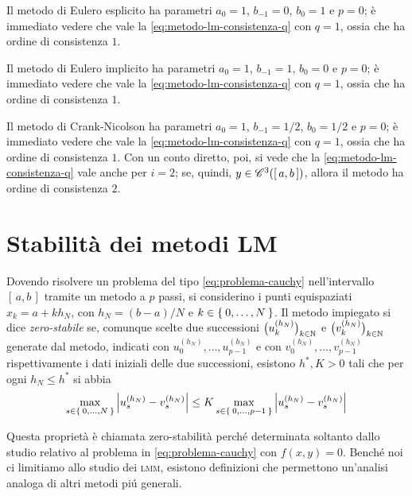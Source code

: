 	\begin{esempio}
		Il metodo di Eulero esplicito ha parametri \(a_0 = 1\), \(b_{- 1} = 0\), \(b_0 = 1\) e \(p = 0\); è immediato vedere che vale la \eqref{eq:metodo-lm-consistenza-q} con \(q = 1\), ossia che ha ordine di consistenza \(1\).
		
		Il metodo di Eulero implicito ha parametri \(a_0 = 1\), \(b_{- 1} = 1\), \(b_0 = 0\) e \(p = 0\); è immediato vedere che vale la \eqref{eq:metodo-lm-consistenza-q} con \(q = 1\), ossia che ha ordine di consistenza \(1\).
		
		Il metodo di Crank-Nicolson ha parametri \(a_0 = 1\), \(b_{- 1} = 1 / 2\), \(b_0 = 1 / 2\) e \(p = 0\); è immediato vedere che vale la \eqref{eq:metodo-lm-consistenza-q} con \(q = 1\), ossia che ha ordine di consistenza \(1\). Con un conto diretto, poi, si vede che la \eqref{eq:metodo-lm-consistenza-q} vale anche per \(i = 2\); se, quindi, \(y \in \mathscr{C}^3 ([\, a, b \,])\), allora il metodo ha ordine di consistenza \(2\).
	\end{esempio}

\section[Stabilità dei metodi \textsc{lm}]{Stabilità dei metodi LM}
	
	\begin{definizione}\label{def:zero-stabile}
		Dovendo risolvere un problema del tipo \eqref{eq:problema-cauchy} nell'intervallo \([\, a, b \,]\) tramite un metodo  a \(p\) passi, si considerino i punti equispaziati \(x_k = a + k h_N\), con \(h_N = (b - a) / N\) e \(k \in \Set{0, \dots, N}\). Il metodo impiegato si dice \emph{zero-stabile} se, comunque scelte due successioni \(\bigl( u_k^{(h_N)} \bigr)_{k \in \mathbb{N}}\) e \(\bigl( v_k^{(h_N)} \bigr)_{k \in \mathbb{N}}\) generate dal metodo, indicati con \(u_0^{(h_N)}, \dots, u_{p - 1}^{(h_N)}\) e con \(v_0^{(h_N)}, \dots, v_{p - 1}^{(h_N)}\) rispettivamente i dati iniziali delle due successioni, esistono \(h^*, K > 0\) tali che per ogni \(h_N \le h^*\) si abbia
		\begin{equation}
			\max_{s \in \Set{0, \dots, N}} \abs{u_s^{(h_N)} - v_s^{(h_N)}} \le K \max_{s \in \Set{0, \dots, p - 1}} \abs{u_s^{(h_N)} - v_s^{(h_N)}}
		\end{equation}
	\end{definizione}

	Questa proprietà è chiamata zero-stabilità perché determinata soltanto dallo studio relativo al problema in \eqref{eq:problema-cauchy} con \(f (x, y) = 0\). Benché noi ci limitiamo allo studio dei \textsc{lmm}, esistono definizioni che permettono un'analisi analoga di altri metodi piú generali.
	
